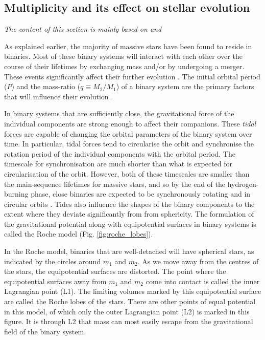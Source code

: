\subsection{Multiplicity and its effect on stellar evolution}

\textit{The content of this section is mainly based on \citet{1992podsiadlowski} and \citet{2001hilditch_close_binaries}}

As explained earlier, the majority of massive stars have been found to reside in binaries. Most of these binary systems will interact with each other over the course of their lifetimes by exchanging mass and/or by undergoing a merger. These events significantly affect their further evolution \citep[see, e.g.][]{1994pols_caseA,langer_presupernova_2012}. The initial orbital period ($P$) and the mass-ratio ($q \equiv M_2/M_1$) of a binary system are the primary factors that will influence their evolution \citep{1992podsiadlowski}.

In binary systems that are sufficiently close, the gravitational force of the individual components are strong enough to affect their companions. These \textit{tidal} forces are capable of changing the orbital parameters of the binary system over time. In particular, tidal forces tend to circularise the orbit and synchronise the rotation period of the individual components with the orbital period. The timescale for synchronisation are much shorter than what is expected for circularisation of the orbit. However, both of these timescales are smaller than the main-sequence lifetimes for massive stars, and so by the end of the hydrogen-burning phase, close binaries are expected to be synchronously rotating and in circular orbits \citep{1981Hut,1977Zahn}. Tides also influence the shapes of the binary components to the extent where they deviate significantly from from sphericity. The formulation of the gravitational potential along with equipotential surfaces in binary systems is called the Roche model (Fig. \ref{fig:roche_lobes}).

In the Roche model, binaries that are well-detached will have spherical stars, as indicated by the circles around $m_1$ and $m_2$. As we move away from the centres of the stars, the equipotential surfaces are distorted. The point where the equipotential surfaces away from $m_1$ and $m_2$ come into contact is called the inner Lagrangian point (L1). The limiting volumes marked by this equipotential surface are called the Roche lobes of the stars. There are other points of equal potential in this model, of which only the outer Lagrangian point (L2) is marked in this figure. It is through L2 that mass can most easily escape from the gravitational field of the binary system.

